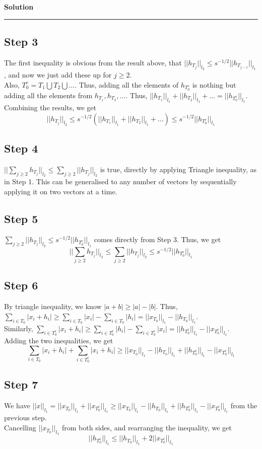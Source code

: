 \documentclass[a4paper,12pt]{article}
\newenvironment{solution}[2][]{%
    \begin{mdframed}[linecolor=blue!70!black, linewidth=2pt, roundcorner=10pt, backgroundcolor=yellow!10!white, skipabove=12pt, skipbelow=12pt]%
        \textbf{\large #2}
        \par\noindent\rule{\textwidth}{0.4pt}
}{
    \end{mdframed}
}
\begin{document}
\begin{solution}{Solution}
\subsection*{Step 3}
The first inequality is obvious from the result above, that $||h_{T_j}||_{l_2} \leq s^{-1/2}||h_{T_{j-1}}||_{l_1}$, and now we just add these up for $j \geq 2$. \\
Also, $T_0^c = T_1 \bigcup T_2 \bigcup \dots$. Thus, adding all the elements of $h_{T_0^c}$ is nothing but adding all the elements from $h_{T_1}, h_{T_2},\dots$. Thus, $||h_{T_1}||_{l_1}+||h_{T_2}||_{l_1}+\dots = ||h_{T_0^c}||_{l_1}$. Combining the results, we get
\[
||h_{T_j}||_{l_2}\leq s^{-1/2}(||h_{T_1}||_{l_1}+||h_{T_2}||_{l_1}+\dots) \leq s^{-1/2}||h_{T_0^c}||_{l_1}
\]

\subsection*{Step 4}
$||\sum_{j \geq 2} h_{T_j}||_{l_2} \leq \sum_{j \geq 2} ||h_{T_j}||_{l_2}$ is true, directly by applying Triangle inequality, as in Step 1. This can be generalised to any number of vectors by sequentially applying it on two vectors at a time. 

\subsection*{Step 5}
$\sum_{j \geq 2}||h_{T_j}||_{l_2} \leq s^{-1/2}||h_{T_0^c}||_{l_1}$ comes directly from Step 3. Thus, we get 
\[
||\sum_{j \geq 2} h_{T_j}||_{l_2} \leq \sum_{j \geq 2} ||h_{T_j}||_{l_2} \leq s^{-1/2}||h_{T_0^c}||_{l_1}
\]

\subsection*{Step 6}
By triangle inequality, we know $|a+b| \geq |a|-|b|$. Thus, $\sum_{i\in T_0} |x_i+h_i| \geq \sum_{i \in T_0} |x_i| - \sum_{i \in T_0} |h_i| = ||x_{T_0}||_{l_1} - ||h_{T_0}||_{l_1}$.\\
Similarly, $\sum_{i\in T_0^c} |x_i+h_i| \geq \sum_{i \in T_0^c} |h_i| - \sum_{i \in T_0^c} |x_i| = ||h_{T_0^c}||_{l_1} - ||x_{T_0^c}||_{l_1}$.\\
Adding the two inequalities, we get 
\[
\sum_{i\in T_0} |x_i+h_i| + \sum_{i\in T_0^c} |x_i+h_i| \geq ||x_{T_0}||_{l_1} - ||h_{T_0}||_{l_1} + ||h_{T_0^c}||_{l_1} - ||x_{T_0^c}||_{l_1}
\]

\subsection*{Step 7}
We have $||x||_{l_1} = ||x_{T_0}||_{l_1}+||x_{T_0^c}||_{l_1}\geq ||x_{T_0}||_{l_1} - ||h_{T_0}||_{l_1} + ||h_{T_0^c}||_{l_1} - ||x_{T_0^c}||_{l_1}$ from the previous step. \\
Cancelling $||x_{T_0}||_{l_1}$ from both sides, and rearranging the inequality, we get 
\[
||h_{T_0^c}||_{l_1} \leq ||h_{T_0}||_{l_1} + 2||x_{T_0^c}||_{l_1}
\]


\end{solution}
\end{document}
